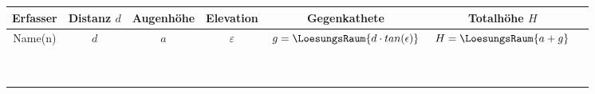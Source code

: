


\renewcommand{\metaHeaderLine}{Arbeitsblatt}
\renewcommand{\arbeitsblattTitel}{Höhenmessung}

\arbeitsblattHeader{}



\begin{center}
\end{center}

\newcommand{\noteSpace}{\noTRAINER{\rule{0pt}{6.5ex}}}

\begin{tabular}{|c|c|c|c|c|c|c|}
\hline
Erfasser & Distanz $d$ & Augenhöhe & Elevation & Gegenkathete & Totalhöhe $H$ \\
\hline
Name(n) & $d$ & $a$ & $\varepsilon$ &  $g=\LoesungsRaum{d\cdot tan(\epsilon)}$ & $H=\LoesungsRaum{a + g}$ \\
\hline
\noteSpace{}&&&&&\\
\hline
\noteSpace{}&&&&&\\
\hline
\noteSpace{}&&&&&\\
\hline
\noteSpace{}&&&&&\\
\hline
\noteSpace{}&&&&&\\
\hline
\noteSpace{}&&&&&\\
\hline
\noteSpace{}&&&&&\\
\hline
\noteSpace{}&&&&&\\
\hline
\noteSpace{}&&&&&\\
\hline
\end{tabular}


